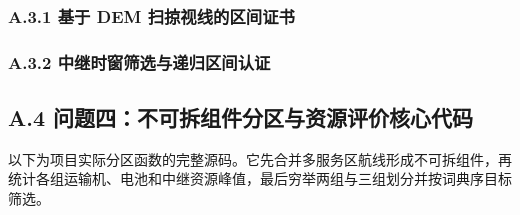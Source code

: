 \subsubsection*{A.3.1 基于 DEM 扫掠视线的区间证书}


\clearpage
\subsubsection*{A.3.2 中继时窗筛选与递归区间认证}


\clearpage
\subsection*{A.4 问题四：不可拆组件分区与资源评价核心代码}
以下为项目实际分区函数的完整源码。它先合并多服务区航线形成不可拆组件，再统计各组运输机、电池和中继资源峰值，最后穷举两组与三组划分并按词典序目标筛选。

